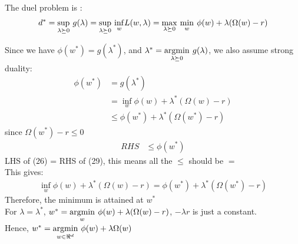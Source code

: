 \documentclass{article}
\newenvironment{sub}[2][$-$]{\begin{trivlist}
		\item[\hskip \labelsep {\bfseries #1}\hskip \labelsep {\bfseries #2.}]}  {\end{trivlist}}
\begin{document}
\pagebreak

\begin{sub}{8.2.2}
\end{sub}
The duel problem is :
\begin{align}
d^* = \underset{\lambda \succeq 0}{\operatorname{sup}} \hspace{0.05in} g(\lambda) = \underset{\lambda \succeq 0}{\operatorname{sup}} \hspace{0.05in} \underset{w}{\operatorname{inf}} L(w,\lambda) = \underset{\lambda \succeq 0}{\operatorname{max}} \hspace{0.05in} \underset{w}{\operatorname{min}} \hspace{0.05in} \phi(w) + \lambda(\Omega(w) - r)  
\end{align} 

\begin{sub}{8.2.3}
\end{sub}
Since we have $\phi(w^*) = g(\lambda^*)$, and $\lambda^* = \underset{\lambda \succeq 0}{\operatorname{argmin}} \hspace{0.05in}g(\lambda)$, we also assume strong duality:
\begin{align}
\phi(w^*) &=g(\lambda^*)\\ &=  \underset{w}{\operatorname{inf}} \phi(w) + \lambda^*(\Omega(w) - r)\\
&\leq \phi(w^*) + \lambda^*(\Omega(w^*) - r)
\end{align}
since  $\Omega(w^*) - r \leq 0$
\begin{align}
RHS &\leq \phi(w^*)
\end{align}
LHS of (26) = RHS of (29), this means all the $\leq$ should be $=$\\
This gives:
\begin{align}
 \underset{w}{\operatorname{inf}} \phi(w) + \lambda^*(\Omega(w) - r) =  \phi(w^*) + \lambda^*(\Omega(w^*) - r)
\end{align}
Therefore, the minimum is attained at $w^*$\\
For $\lambda = \lambda^*$, $w^*= \underset{w}{\operatorname{argmin}} \hspace{0.05in} \phi(w) + \lambda(\Omega(w) - r)$, $- \lambda r$ is just a constant.\\
Hence, $w^*= \underset{w \in \Re^d}{\operatorname{argmin}} \hspace{0.05in}\phi(w) + \lambda \Omega(w) $
\end{document}
